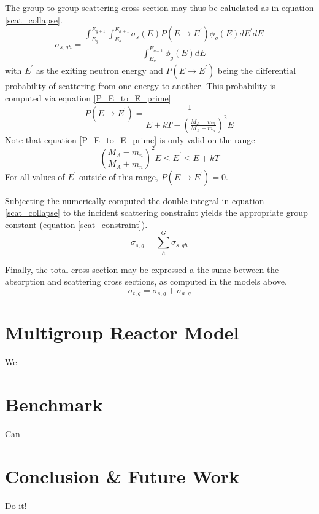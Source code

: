 The group-to-group scattering cross section may thus be caluclated as in equation \ref{scat_collapse}.
\begin{equation}
\label{scat_collapse}
\sigma_{s,gh} = \frac{\int_{E_g}^{E_{g+1}} \int_{E_h}^{E_{h+1}} \sigma_s(E) P(E \to E^\prime) \phi_g(E) dE^\prime dE}
                     {\int_{E_g}^{E_{g+1}} \phi_g(E) dE}
\end{equation}
with $E^\prime$ as the exiting neutron energy and $P(E \to E^\prime)$ being the differential probability of 
scattering from one energy to another.  This probability is computed via equation \ref{P_E_to_E_prime}
\begin{equation}
\label{P_E_to_E_prime}
P(E \to E^\prime) = \frac{1}{E + kT - \left(\frac{M_A - m_n}{M_A + m_n}\right)^2 E}
\end{equation}
Note that equation \ref{P_E_to_E_prime} is only valid on the range 
\begin{equation}
\label{P_E_to_E_prime_range}
\left(\frac{M_A - m_n}{M_A + m_n}\right)^2 E \le E^\prime \le E + kT
\end{equation}
For all values of $E^\prime$ outside of this range, $P(E \to E^\prime) = 0$.

Subjecting the numerically computed the double integral in equation \ref{scat_collapse} 
to the incident scattering constraint yields the appropriate group constant (equation \ref{scat_constraint}).
\begin{equation}
\label{scat_constraint}
\sigma_{s,g} = \sum_h^G \sigma_{s,gh}
\end{equation}

Finally, the total cross section may be expressed a the sume between the absorption and scattering
cross sections, as computed in the models above.
\begin{equation}
\label{tot_xs_model}
\sigma_{t,g} = \sigma_{s,g} + \sigma_{a,g}
\end{equation}

\section{Multigroup Reactor Model}
We

\section{Benchmark}
Can

\section{Conclusion \& Future Work}
Do it!

